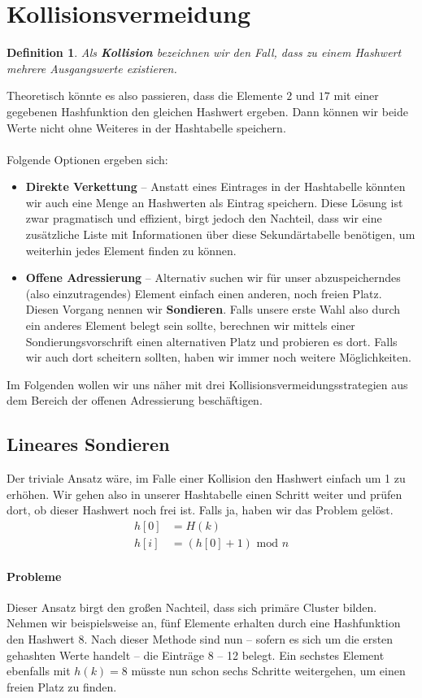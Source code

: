 \documentclass[11pt,a4paper]{scrartcl}
\newtheorem{definition}{Definition}
\begin{document}
\section{Kollisionsvermeidung}
\begin{definition}
Als \textbf{Kollision} bezeichnen wir den Fall, dass zu einem Hashwert mehrere Ausgangswerte existieren. 
\end{definition}
Theoretisch könnte es also passieren, dass die Elemente $2$ und $17$ mit einer gegebenen Hashfunktion den gleichen Hashwert ergeben. Dann können wir beide Werte nicht ohne Weiteres in der Hashtabelle speichern. \\\\
Folgende Optionen ergeben sich:
\begin{itemize}
\item \textbf{Direkte Verkettung} -- Anstatt eines Eintrages in der Hashtabelle könnten wir auch eine Menge an Hashwerten als Eintrag speichern. Diese Lösung ist zwar pragmatisch und effizient, birgt jedoch den Nachteil, dass wir eine zusätzliche Liste mit Informationen über diese Sekundärtabelle benötigen, um weiterhin jedes Element finden zu können.
\item \textbf{Offene Adressierung} -- Alternativ suchen wir für unser abzuspeicherndes (also einzutragendes) Element einfach einen anderen, noch freien Platz. Diesen Vorgang nennen wir \textbf{Sondieren}. Falls unsere erste Wahl also durch ein anderes Element belegt sein sollte, berechnen wir mittels einer Sondierungsvorschrift einen alternativen Platz und probieren es dort. Falls wir auch dort scheitern sollten, haben wir immer noch weitere Möglichkeiten.
\end{itemize}
Im Folgenden wollen wir uns näher mit drei Kollisionsvermeidungsstrategien aus dem Bereich der offenen Adressierung beschäftigen.
\subsection{Lineares Sondieren}
Der triviale Ansatz wäre, im Falle einer Kollision den Hashwert einfach um 1 zu erhöhen. Wir gehen also in unserer Hashtabelle einen Schritt weiter und prüfen dort, ob dieser Hashwert noch frei ist. Falls ja, haben wir das Problem gelöst.
\begin{align*}
h[0] &= H(k) \\
h[i] &= (h[0] + 1) \text{ mod } n
\end{align*}
\paragraph{Probleme} Dieser Ansatz birgt den großen Nachteil, dass sich primäre Cluster bilden. Nehmen wir beispielsweise an, fünf Elemente erhalten durch eine Hashfunktion den Hashwert $8$. Nach dieser Methode sind nun -- sofern es sich um die ersten gehashten Werte handelt -- die Einträge 8 -- 12 belegt. Ein sechstes Element ebenfalls mit $h(k) = 8$ müsste nun schon sechs Schritte weitergehen, um einen freien Platz zu finden.
\end{document}
